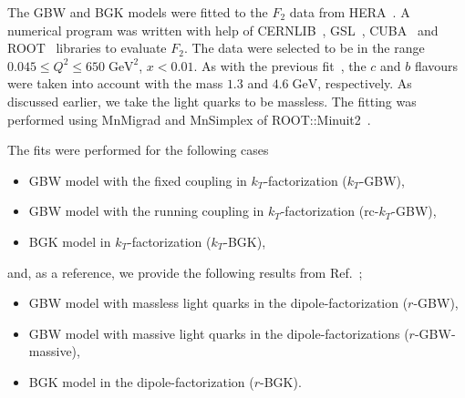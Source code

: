 \documentclass[11pt]{article}
\numberwithin{equation}{section}
\numberwithin{table}{section}
\numberwithin{figure}{section}
\begin{document}
The GBW and BGK models were fitted to the $F_2$ data from HERA~\cite{Abt:2017nkc}. A numerical program was written with help of CERNLIB~\cite{Kolbig:1972zz}, GSL~\cite{GSL}, CUBA~\cite{Hahn:2004fe} and ROOT~\cite{Brun:1997pa} libraries to evaluate $F_2$. The data were selected to be in the range $0.045\leq Q^2\leq 650\;\mathrm{GeV^2}$, $x<0.01$.
As with the previous fit~\cite{Goda:2022wsc}, the $c$ and $b$ flavours were taken into account with the mass $1.3$ and $4.6\;\mathrm{GeV}$, respectively. As discussed earlier, we take the light quarks to be massless.
The fitting was performed using MnMigrad and MnSimplex of ROOT::Minuit2~\cite{James:2004xla}.

The fits were performed for the following cases
\begin{itemize}
\item GBW model with the fixed coupling in $k_T$-factorization  ($k_T$-GBW),
\item GBW model with the running coupling in $k_T$-factorization (rc-$k_T$-GBW),
\item BGK model in $k_T$-factorization ($k_T$-BGK),
\end{itemize} 
and, as a reference, we provide the following results from Ref.~\cite{Goda:2022wsc};
\begin{itemize}
\item GBW model with massless light quarks in the dipole-factorization ($r$-GBW),
\item GBW model with massive light quarks in the dipole-factorizations ($r$-GBW-massive),
\item  BGK model in  the dipole-factorization ($r$-BGK).
\end{itemize} 
\end{document}
